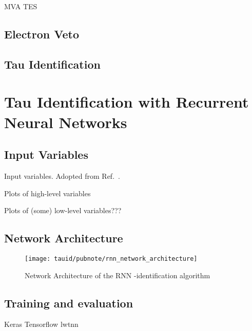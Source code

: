 MVA TES


\subsection{Electron Veto}

\subsection{Tau Identification}



\section{Tau Identification with Recurrent Neural Networks}
\label{sec:tauid_rnn}

\subsection{Input Variables}

\begin{table}[htbp]
  \centering

  \caption{Input variables. Adopted from
    Ref.~\cite{ATL-PHYS-PUB-2019-033}.}%
  \label{tab:tauid_input_variables}

  
\end{table}

Plots of high-level variables

Plots of (some) low-level variables???


\subsection{Network Architecture}

\begin{figure}[htbp]
  \centering

  \texttt{[image: tauid/pubnote/rnn\_network\_architecture]}

  \caption{Network Architecture of the RNN \tauhad-identification
    algorithm \cite{ATL-PHYS-PUB-2019-033}}
  \label{fig:tauid_network_architecture}
\end{figure}

\subsection{Training and evaluation}

Keras Tensorflow lwtnn \cite{lwtnn,keras,tensorflow2015-whitepaper,lstm}

